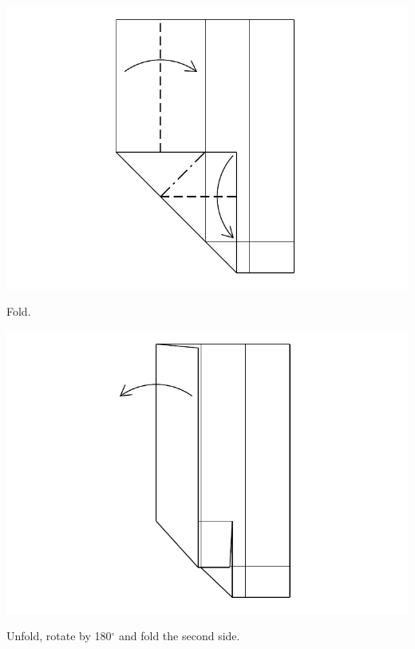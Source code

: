 \documentclass[11pt]{article}
\begin{document}
\vspace*{0.5in}

\begin{minipage}[t]{0.45\textwidth}
  \includegraphics[width=\textwidth]{../figs/fig04-06}
  \begin{itemize}{\item[6.] Fold.}\end{itemize}
\end{minipage}
\hfill
\begin{minipage}[t]{0.45\textwidth}
  \includegraphics[width=\textwidth]{../figs/fig04-07}
  \begin{itemize}{\item[7.] Unfold, rotate by 180$^\circ$ and fold the second side.}\end{itemize}
\end{minipage}
\end{document}
